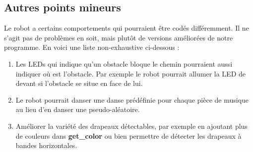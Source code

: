 \documentclass{article}
\begin{document}
    \subsection{Autres points mineurs}
    Le robot a certains comportements qui pourraient être codés différemment.
    Il ne s'agit pas de problèmes en soit, mais plutôt de versions améliorées de notre programme.
    En voici une liste non-exhaustive ci-dessous : 
    \begin{enumerate}
        \item Les LEDs qui indique qu'un obstacle bloque le chemin pourraient aussi indiquer où est l'obstacle.
        Par exemple le robot pourrait allumer la LED de devant si l'obstacle se situe en face de lui.
        \item Le robot pourrait danser une danse prédéfinie pour chaque pièce de musique au lieu d'en danser une pseudo-aléatoire.
        \item Améliorer la variété des drapeaux détectables, par exemple en ajoutant plus de couleurs dans \textbf{get\_color} ou bien permettre de détecter les drapeaux à bandes horizontales. 
    \end{enumerate}
    
    \printbibliography
\end{document}
